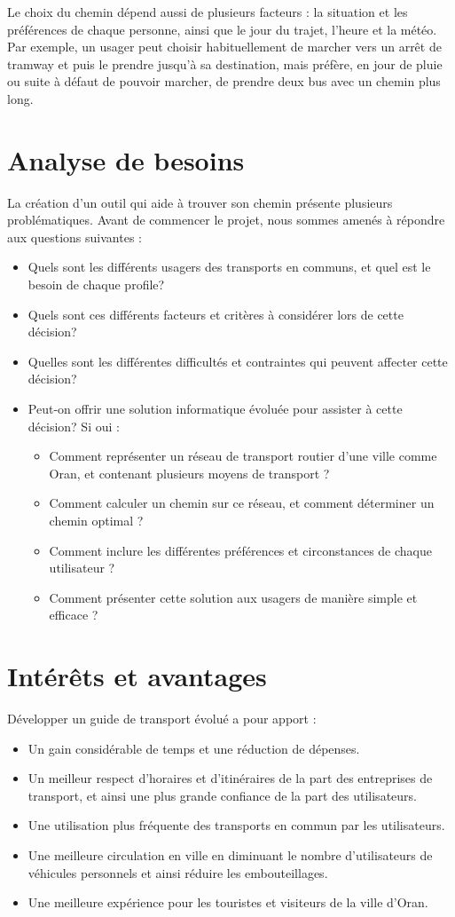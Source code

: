 Le choix du chemin dépend aussi de plusieurs facteurs : la situation et les préférences de chaque personne, ainsi que le jour du trajet, l'heure et la météo. Par exemple, un usager peut choisir habituellement de marcher vers un arrêt de tramway et puis le prendre jusqu'à sa destination, mais préfère, en jour de pluie ou suite à défaut de pouvoir marcher, de prendre deux bus avec un chemin plus long.

\section{Analyse de besoins}
La création d'un outil qui aide à trouver son chemin présente plusieurs problématiques. Avant de commencer le projet, nous sommes amenés à répondre aux questions suivantes :
\begin{itemize}
	\item Quels sont les différents usagers des transports en communs, et quel est le besoin de chaque profile?
	\item Quels sont ces différents facteurs et critères à considérer lors de cette décision?
	\item Quelles sont les différentes difficultés et contraintes qui peuvent affecter cette décision?
	\item Peut-on offrir une solution informatique évoluée pour assister à cette décision? Si oui : 
	      \begin{itemize}
	      	\item Comment représenter un réseau de transport routier d'une ville comme Oran, et contenant plusieurs moyens de transport ?
	      	\item Comment calculer un chemin sur ce réseau, et comment déterminer un chemin optimal ?
	      	\item Comment inclure les différentes préférences et circonstances de chaque utilisateur ?
	      	\item Comment présenter cette solution aux usagers de manière simple et efficace ?
	      \end{itemize}
\end{itemize}

\section{Intérêts et avantages}
Développer un guide de transport évolué a pour apport :
\begin{itemize}
	\item Un gain considérable de temps et une réduction de dépenses.
	\item Un meilleur respect d'horaires et d'itinéraires de la part des entreprises de transport, et ainsi une plus grande confiance de la part des utilisateurs.
	\item Une utilisation plus fréquente des transports en commun par les utilisateurs.
	\item Une meilleure circulation en ville en diminuant le nombre d'utilisateurs de véhicules personnels et ainsi réduire les embouteillages.
	\item Une meilleure expérience pour les touristes et visiteurs de la ville d'Oran.
\end{itemize}

